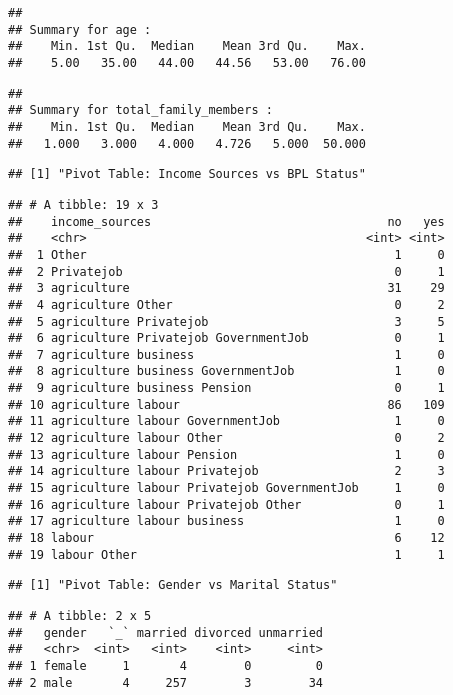 \documentclass[
]{article}
\begin{document}
\begin{verbatim}
## 
## Summary for age :
##    Min. 1st Qu.  Median    Mean 3rd Qu.    Max. 
##    5.00   35.00   44.00   44.56   53.00   76.00
\end{verbatim}

\begin{verbatim}
## 
## Summary for total_family_members :
##    Min. 1st Qu.  Median    Mean 3rd Qu.    Max. 
##   1.000   3.000   4.000   4.726   5.000  50.000
\end{verbatim}

\begin{verbatim}
## [1] "Pivot Table: Income Sources vs BPL Status"
\end{verbatim}

\begin{verbatim}
## # A tibble: 19 x 3
##    income_sources                                 no   yes
##    <chr>                                       <int> <int>
##  1 Other                                           1     0
##  2 Privatejob                                      0     1
##  3 agriculture                                    31    29
##  4 agriculture Other                               0     2
##  5 agriculture Privatejob                          3     5
##  6 agriculture Privatejob GovernmentJob            0     1
##  7 agriculture business                            1     0
##  8 agriculture business GovernmentJob              1     0
##  9 agriculture business Pension                    0     1
## 10 agriculture labour                             86   109
## 11 agriculture labour GovernmentJob                1     0
## 12 agriculture labour Other                        0     2
## 13 agriculture labour Pension                      1     0
## 14 agriculture labour Privatejob                   2     3
## 15 agriculture labour Privatejob GovernmentJob     1     0
## 16 agriculture labour Privatejob Other             0     1
## 17 agriculture labour business                     1     0
## 18 labour                                          6    12
## 19 labour Other                                    1     1
\end{verbatim}

\begin{verbatim}
## [1] "Pivot Table: Gender vs Marital Status"
\end{verbatim}

\begin{verbatim}
## # A tibble: 2 x 5
##   gender   `_` married divorced unmarried
##   <chr>  <int>   <int>    <int>     <int>
## 1 female     1       4        0         0
## 2 male       4     257        3        34
\end{verbatim}
\end{document}
